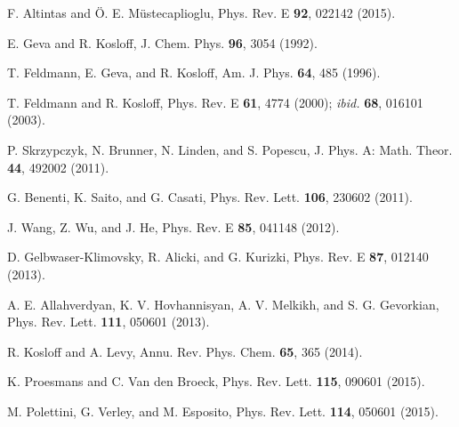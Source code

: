 \documentclass[aps,pra,floatfix,twocolumn,groupedaddress,superscriptaddress,nofootinbib,notitlepage,amsmath,amssymb,]{revtex4-1}
\begin{document}
\begin{thebibliography}{100}
 F. Altintas and \"O. E. M\"ustecaplioglu, Phys. Rev. E \textbf{92}, 022142 (2015).

 E. Geva and R. Kosloff, J. Chem. Phys. \textbf{96}, 3054 (1992).

 T. Feldmann, E. Geva, and R. Kosloff,  Am. J. Phys. \textbf{64}, 485 (1996).

 T. Feldmann and R. Kosloff, Phys. Rev. E \textbf{61}, 4774 (2000); 
\textit{ibid.} \textbf{68}, 016101 (2003).

 P. Skrzypczyk, N. Brunner, N. Linden, and S. Popescu, J. Phys. A: Math. Theor. \textbf{44}, 492002 (2011).

 G. Benenti, K. Saito, and G. Casati, Phys. Rev. Lett. \textbf{106}, 230602 (2011).

 J. Wang, Z. Wu, and J. He, Phys. Rev. E \textbf{85}, 041148 (2012). 

 D. Gelbwaser-Klimovsky, R. Alicki, and G. Kurizki, Phys. Rev. E \textbf{87}, 012140 (2013).

 A. E. Allahverdyan, K. V. Hovhannisyan, A. V. Melkikh, and S. G. Gevorkian, Phys. Rev. Lett. \textbf{111}, 050601 (2013).

 R. Kosloff and A. Levy, Annu. Rev. Phys. Chem. \textbf{65}, 365 (2014).

 K. Proesmans and C. Van den Broeck, Phys. Rev. Lett. \textbf{115}, 090601 (2015).

 M. Polettini, G. Verley, and M. Esposito, Phys. Rev. Lett. \textbf{114}, 050601 (2015).


\end{thebibliography}
\end{document}
